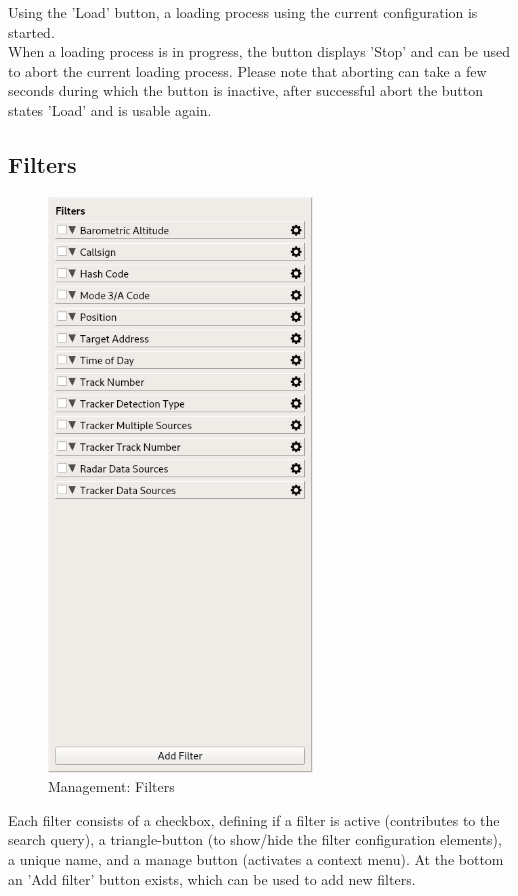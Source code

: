 Using the 'Load' button, a loading process using the current configuration is started.  \\

When a loading process is in progress, the button displays 'Stop' and can be used to abort the current loading process. Please note that aborting can take a few seconds during which the button is inactive, after successful abort the button states 'Load' and is usable again.

\subsection{Filters}

\begin{figure}[H]
  \center
    \includegraphics[width=7cm,frame]{../screenshots/management_filters.png}
  \caption{Management: Filters}
\end{figure}

Each filter consists of a checkbox, defining if a filter is active (contributes to the search query), a triangle-button (to show/hide the filter configuration elements), a unique name, and a manage button (activates a context menu). At the bottom an 'Add filter' button exists, which can be used to add new filters. \\

